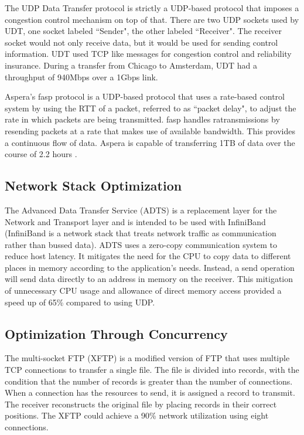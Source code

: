 The UDP Data Transfer protocol \cite{gu2007udt} is strictly a UDP-based protocol that imposes a congestion control mechanism on top of that. There are two UDP sockets used by UDT, one socket labeled ``Sender", the other labeled ``Receiver". The receiver socket would not only receive data, but it would be used for sending control information. UDT used TCP like messages for congestion control and reliability insurance. During a transfer from Chicago to Amsterdam, UDT had a throughput of 940Mbps over a 1Gbps link.

Aspera's fasp protocol \cite{Fan2010}\cite{Aspera2016} is a UDP-based protocol that uses a rate-based control system by using the RTT of a packet, referred to as ``packet delay", to adjust the rate in which packets are being transmitted. fasp handles ratransmissions by resending packets at a rate that makes use of available bandwidth. This provides a continuous flow of data. Aspera is capable of transferring 1TB of data over the course of 2.2 hours \cite{Fan2010}.

\subsection{Network Stack Optimization}

The Advanced Data Transfer Service (ADTS) \cite{lai2009designing} is a replacement layer for the Network and Transport layer and is intended to be used with InfiniBand \cite{Pfister2001} (InfiniBand is a network stack that treats network traffic as communication rather than bussed data). ADTS uses a zero-copy communication system to reduce host latency. It mitigates the need for the CPU to copy data to different places in memory according to the application's needs. Instead, a send operation will send data directly to an address in memory on the receiver. This mitigation of unnecessary CPU usage and allowance of direct memory access provided a speed up of 65\% compared to using UDP.

\subsection{Optimization Through Concurrency}

The multi-socket FTP (XFTP) \cite{Allman1995}\cite{Allman1997} is a modified version of FTP \cite{postel1980user} that uses multiple TCP connections to transfer a single file. The file is divided into records, with the condition that the number of records is greater than the number of connections. When a connection has the resources to send, it is assigned a record to transmit. The receiver reconstructs the original file by placing records in their correct positions. The XFTP could achieve a 90\% network utilization using eight connections.

